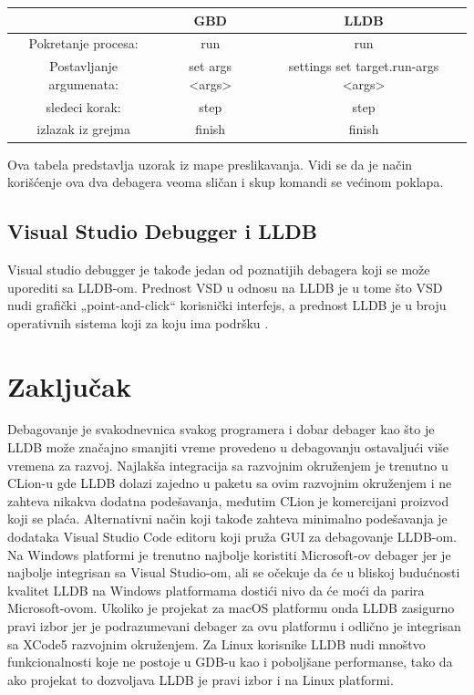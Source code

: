 \documentclass[a4paper]{article}
\begin{document}
\begin{center}
	\begin{tabular}{c | c | c}
		& GBD & LLDB \\ 
		\hline
		Pokretanje procesa: & run & run \\ 
		\hline 
		Postavljanje argumenata: &set args <args>
		& settings set target.run-args <args> \\
		\hline
		sledeci korak: & step & step \\
		\hline
		izlazak iz grejma & finish & finish
	\end{tabular}
\end{center}

\indent Ova tabela predstavlja uzorak iz mape preslikavanja. Vidi se da je način korišćenje ova dva debagera veoma sličan i skup komandi se većinom poklapa. 

\subsection{Visual Studio Debugger i LLDB}
\label{subsec: Visual Studio Debugger i LLDB}


Visual studio debugger je takođe jedan od poznatijih debagera koji se može uporediti sa LLDB-om. Prednost VSD u odnosu na LLDB je u tome što VSD nudi grafički „point-and-click“ korisnički interfejs, a prednost LLDB je u broju operativnih sistema koji za koju ima podršku \cite{vsd}.

\section{Zaključak}
\label{sec:zakljucak}

Debagovanje je svakodnevnica svakog programera i dobar debager kao što je LLDB može značajno smanjiti vreme provedeno u debagovanju ostavaljući više vremena za razvoj. 
Najlakša integracija sa razvojnim okruženjem je trenutno u CLion-u gde LLDB dolazi zajedno u paketu sa ovim razvojnim okruženjem i ne zahteva nikakva dodatna podešavanja, međutim CLion je komercijani proizvod koji se plaća. Alternativni način koji takođe zahteva minimalno podešavanja je dodataka Visual Studio Code editoru koji pruža GUI za debagovanje LLDB-om. Na Windows platformi je trenutno najbolje koristiti Microsoft-ov debager jer je najbolje integrisan sa Visual Studio-om, ali se očekuje da će u bliskoj budućnosti kvalitet LLDB na Windows platformama dostići nivo da će moći da parira Microsoft-ovom. Ukoliko je projekat za macOS platformu onda LLDB zasigurno pravi izbor jer je podrazumevani debager za ovu platformu i odlično je integrisan sa XCode5 razvojnim okruženjem. Za Linux korisnike LLDB nudi mnoštvo funkcionalnosti koje ne postoje u GDB-u kao i poboljšane performanse, tako da ako projekat to dozvoljava LLDB je pravi izbor i na Linux platformi. 
\appendix
 

\end{document}
